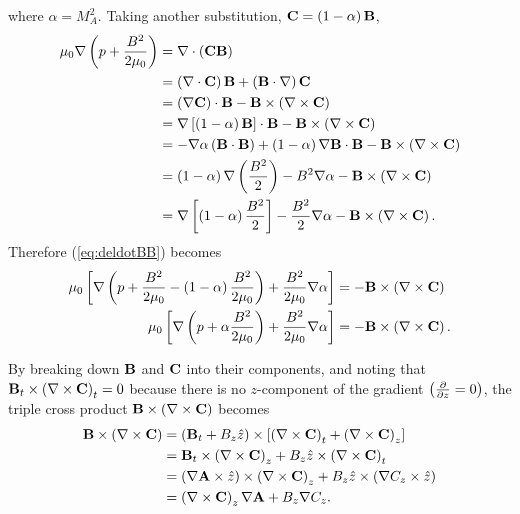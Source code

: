 where $\alpha=M_A^2$. Taking another substitution, $\mathbf{C} = \left( 1-\alpha \right)\mathbf{B}$,
\[
\begin{split}
    \mu_0\nabla\left( p + \frac{B^2}{2\mu_0} \right) &= \nabla \cdot\left( \mathbf{C}\mathbf{B} \right) \\
    &= \left( \nabla \cdot\mathbf{C} \right)\mathbf{B} + \left( \mathbf{B}\cdot\nabla \right)\mathbf{C} \\
    &= \left( \nabla \mathbf{C} \right)\cdot\mathbf{B} - \mathbf{B}\times\left( \nabla \times \mathbf{C} \right) \\
    &= \nabla\left[ \left( 1-\alpha \right)\mathbf{B} \right]\cdot\mathbf{B} - \mathbf{B}\times\left( \nabla \times \mathbf{C} \right) \\
    &= -\nabla\alpha\left( \mathbf{B}\cdot\mathbf{B} \right) + \left( 1-\alpha \right)\nabla\mathbf{B}\cdot\mathbf{B} - \mathbf{B}\times\left( \nabla \times \mathbf{C} \right) \\
    &= \left( 1-\alpha \right)\nabla\left( \frac{B^2}{2} \right) - B^2\nabla\alpha - \mathbf{B}\times\left( \nabla \times \mathbf{C} \right) \\
    &= \nabla\left[ \left( 1-\alpha \right)\frac{B^2}{2} \right] - \frac{B^2}{2}\nabla\alpha - \mathbf{B}\times\left( \nabla \times \mathbf{C} \right). \\
\end{split}
\]
Therefore (\ref{eq:deldotBB}) becomes
\begin{equation}
    \begin{split}
        \mu_0\left[ \nabla\left( p + \frac{B^2}{2\mu_0} - \left( 1-\alpha \right)\frac{B^2}{2\mu_0} \right) + \frac{B^2}{2\mu_0}\nabla\alpha \right] &= -\mathbf{B}\times\left( \nabla \times \mathbf{C} \right) \\
        \mu_0\left[ \nabla\left( p + \alpha\frac{B^2}{2\mu_0} \right) + \frac{B^2}{2\mu_0}\nabla\alpha \right] &= -\mathbf{B}\times\left( \nabla \times \mathbf{C} \right). \\
    \end{split}
\end{equation}

\noindent By breaking down $\mathbf{B}$ and $\mathbf{C}$ into their components, and noting that $\mathbf{B}_t \times \left( \nabla \times\mathbf{C} \right)_t =0$ because there is no $z$-component of the gradient $\left( \frac{\partial}{\partial z}=0 \right)$, the triple cross product $\mathbf{B}\times\left( \nabla \times\mathbf{C} \right)$ becomes
\begin{equation}
    \begin{split}
        \mathbf{B}\times\left( \nabla \times\mathbf{C} \right) &= \left( \mathbf{B}_t + B_z\hat{z} \right)\times\left[ \left( \nabla \times\mathbf{C} \right)_t + \left( \nabla \times\mathbf{C} \right)_z \right] \\
        &= \mathbf{B}_t\times \left( \nabla \times\mathbf{C} \right)_z + B_z\hat{z}\times\left( \nabla \times\mathbf{C} \right)_t \\
        &= \left( \nabla\mathbf{A}\times\hat{z} \right)\times \left( \nabla \times\mathbf{C} \right)_z + B_z\hat{z} \times \left( \nabla C_z\times\hat{z} \right) \\
        &= \left( \nabla \times\mathbf{C} \right)_z\nabla\mathbf{A} +  B_z\nabla C_z. \\
    \end{split}
\end{equation}

